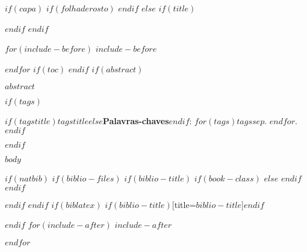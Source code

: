 \documentclass[$if(fontsize)$$fontsize$,$endif$$if(lang)$$lang$,$endif$$if(papersize)$$papersize$,$endif$$for(classoption)$$classoption$$sep$,$endfor$]{$documentclass$}	%
\begin{document}
	
	
	\frenchspacing 
	
	
$if(capa)$
\imprimircapa	%
$if(folhaderosto)$
\imprimirfolhaderosto	%
$endif$
$else$
$if(title)$
\maketitle	%
$endif$
$endif$

$for(include-before)$
$include-before$

$endfor$
$if(toc)$
{
\hypersetup{linkcolor=black}
\setcounter{tocdepth}{$toc-depth$}
\noindent\tableofcontents	%
}
$endif$
$if(abstract)$
\begin{resumoumacoluna}
$abstract$	%

$if(tags)$
\vspace{\onelineskip}

\noindent
\textbf{$if(tagstitle)$$tagstitle$$else$Palavras-chaves$endif$}: $for(tags)$$tags$$sep$. $endfor$.	%
$endif$
\end{resumoumacoluna}
$endif$

\textual	%
$body$	%

$if(natbib)$
$if(biblio-files)$
$if(biblio-title)$
$if(book-class)$
\renewcommand\bibname{$biblio-title$}
$else$
\renewcommand\refname{$biblio-title$}
$endif$
$endif$


$endif$
$endif$
$if(biblatex)$
\printbibliography$if(biblio-title)$[title=$biblio-title$]$endif$

$endif$
$for(include-after)$
$include-after$

$endfor$
\end{document}
